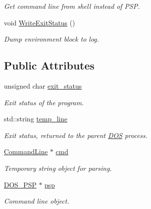 \begin{DoxyCompactItemize}
\begin{DoxyCompactList}\small\item\em Get command line from shell instead of P\-S\-P. \end{DoxyCompactList}\item 
\hypertarget{classProgram_ab1fa236943ef14b02c59bc4225d216a1}{void \hyperlink{classProgram_ab1fa236943ef14b02c59bc4225d216a1}{Write\-Exit\-Status} ()}\label{classProgram_ab1fa236943ef14b02c59bc4225d216a1}

\begin{DoxyCompactList}\small\item\em Dump environment block to log. \end{DoxyCompactList}\end{DoxyCompactItemize}
\subsection*{Public Attributes}
\begin{DoxyCompactItemize}
\item 
\hypertarget{classProgram_a9e1bb1fc1b315bf697fb1872d6defe12}{unsigned char \hyperlink{classProgram_a9e1bb1fc1b315bf697fb1872d6defe12}{exit\-\_\-status}}\label{classProgram_a9e1bb1fc1b315bf697fb1872d6defe12}

\begin{DoxyCompactList}\small\item\em Exit status of the program. \end{DoxyCompactList}\item 
\hypertarget{classProgram_ade1241ef2184833339588494094f7d4f}{std\-::string \hyperlink{classProgram_ade1241ef2184833339588494094f7d4f}{temp\-\_\-line}}\label{classProgram_ade1241ef2184833339588494094f7d4f}

\begin{DoxyCompactList}\small\item\em Exit status, returned to the parent \hyperlink{classDOS}{D\-O\-S} process. \end{DoxyCompactList}\item 
\hypertarget{classProgram_af637f18e9637b148fbecbd3f0bc748fc}{\hyperlink{classCommandLine}{Command\-Line} $\ast$ \hyperlink{classProgram_af637f18e9637b148fbecbd3f0bc748fc}{cmd}}\label{classProgram_af637f18e9637b148fbecbd3f0bc748fc}

\begin{DoxyCompactList}\small\item\em Temporary string object for parsing. \end{DoxyCompactList}\item 
\hypertarget{classProgram_af2f99e812360b3748ec790f4e4023fc4}{\hyperlink{classDOS__PSP}{D\-O\-S\-\_\-\-P\-S\-P} $\ast$ \hyperlink{classProgram_af2f99e812360b3748ec790f4e4023fc4}{psp}}\label{classProgram_af2f99e812360b3748ec790f4e4023fc4}

\begin{DoxyCompactList}\small\item\em Command line object. \end{DoxyCompactList}\end{DoxyCompactItemize}


